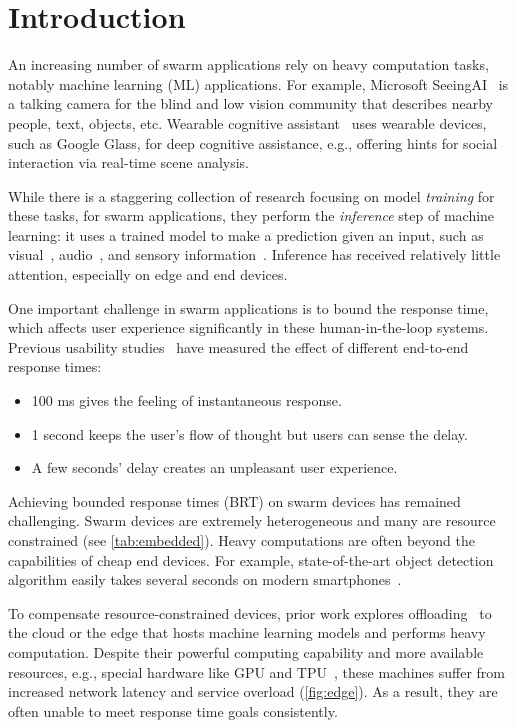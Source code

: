 \section{Introduction}
\label{sec:introduction}

An increasing number of swarm applications rely on heavy computation tasks,
notably machine learning (ML) applications. For example, Microsoft
SeeingAI~\cite{seeingai} is a talking camera for the blind and low vision
community that describes nearby people, text, objects, etc. Wearable cognitive
assistant~\cite{ha2014towards} uses wearable devices, such as Google Glass, for
deep cognitive assistance, e.g., offering hints for social interaction via
real-time scene analysis.

While there is a staggering collection of research focusing on model
\textit{training} for these tasks, for swarm applications, they perform the
\textit{inference} step of machine learning: it uses a trained model to make a
prediction given an input, such as visual~\cite{googlelens, ha2014towards,
  seeingai}, audio~\cite{alexa, applesiri, cortana}, and sensory
information~\cite{laput2017synthetic, lu2010jigsaw}. Inference has received
relatively little attention, especially on edge and end devices.

One important challenge in swarm applications is to bound the response time,
which affects user experience significantly in these human-in-the-loop
systems. Previous usability studies~\cite{nielsen1994usability,
  schneiderman1998designing} have measured the effect of different end-to-end
response times:

\begin{itemize}[noitemsep, topsep=0pt]
\item 100 ms gives the feeling of instantaneous response.
\item 1 second keeps the user's flow of thought but users can sense the delay.
\item A few seconds' delay creates an unpleasant user experience.
\end{itemize}

Achieving bounded response times (BRT) on swarm devices has remained
challenging. Swarm devices are extremely heterogeneous and many are resource
constrained (see \autoref{tab:embedded}). Heavy computations are often beyond
the capabilities of cheap end devices. For example, state-of-the-art object
detection algorithm easily takes several seconds on modern
smartphones~\cite{chen2015glimpse}.

To compensate resource-constrained devices, prior work explores
offloading~\cite{chun2011clonecloud,cuervo2010maui} to the cloud or the edge
that hosts machine learning models and performs heavy computation. Despite their
powerful computing capability and more available resources, e.g., special
hardware like GPU and TPU~\cite{jouppi2017datacenter}, these machines suffer
from increased network latency and service overload (\autoref{fig:edge}). As a
result, they are often unable to meet response time goals consistently.

